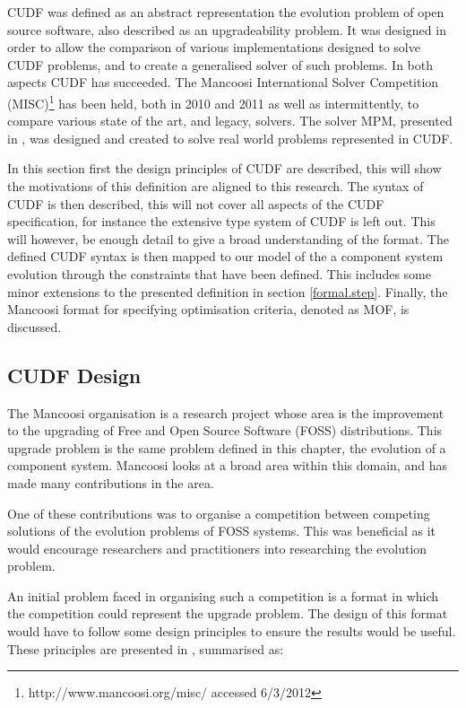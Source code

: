 CUDF was defined as an abstract representation the evolution problem of open source software, also described as an upgradeability problem.
It was designed in order to allow the comparison of various implementations designed to solve CUDF problems, 
and to create a generalised solver of such problems.
In both aspects CUDF has succeeded.
The Mancoosi International Solver Competition (MISC)\footnote{http://www.mancoosi.org/misc/ accessed 6/3/2012} has been held, both in 2010 and 2011 as well as intermittently, 
to compare various state of the art, and legacy, solvers.
The solver MPM, presented in \citep{abate2011}, was designed and created to solve real world problems represented in CUDF.

In this section first the design principles of CUDF are described, this will show the motivations of this definition are aligned to this research.
The syntax of CUDF is then described, this will not cover all aspects of the CUDF specification, for instance the extensive type system of CUDF is left out.
This will however, be enough detail to give a broad understanding of the format.
The defined CUDF syntax is then mapped to our model of the a component system evolution through the constraints that have been defined.
This includes some minor extensions to the presented definition in section \ref{formal.step}.
Finally, the Mancoosi format for specifying optimisation criteria, denoted as MOF, is discussed.

\subsection{CUDF Design}
The Mancoosi organisation is a research project whose area is the improvement to the upgrading of Free and Open Source Software (FOSS) distributions.
This upgrade problem is the same problem defined in this chapter, the evolution of a component system.
Mancoosi looks at a broad area within this domain, and has made many contributions in the area.

One of these contributions was to organise a competition between competing solutions of the evolution problems of FOSS systems.
This was beneficial as it would encourage researchers and practitioners into researching the evolution problem.

An initial problem faced in organising such a competition is a format in which the competition could represent the upgrade problem.
The design of this format would have to follow some design principles to ensure the results would be useful.
These principles are presented in \citep{treinen2009common}, summarised as:

